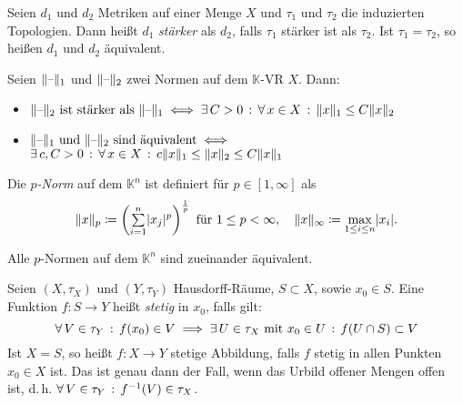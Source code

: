 \documentclass{cheat-sheet}
\newcommand{\K}{\mathbb{K}}
\begin{document}
\begin{definition}
  Seien $d_1$ und $d_2$ Metriken auf einer Menge $X$ und $\tau_1$ und $\tau_2$ die induzierten Topologien. Dann heißt $d_1$ \emph{stärker} als $d_2$, falls $\tau_1$ stärker ist als $\tau_2$. Ist $\tau_1 = \tau_2$, so heißen $d_1$ und $d_2$ äquivalent.
\end{definition}


\begin{satz}
  Seien $\lVert\text{--}\rVert_1$ und $\lVert\text{--}\rVert_2$ zwei Normen auf dem $\K$-VR $X$. Dann:
  \begin{itemize}
    \item $\lVert\text{--}\rVert_2 \text{ ist stärker als } \lVert\text{--}\rVert_1 \iff \exists \, {C > 0} \,:\, \forall \, {x \in X} \,:\, \lVert x\rVert_1 \leq C \lVert x\rVert_2$
    \item $\lVert\text{--}\rVert_1 \text{ und } \lVert\text{--}\rVert_2 \text{ sind äquivalent} \iff $\\
    $\exists \, {c, C > 0} \,:\, \forall \, {x \in X} \,:\, c \lVert x\rVert_1 \leq \lVert x\rVert_2 \leq C \lVert x\rVert_1$
  \end{itemize}
\end{satz}

\begin{definition}
  Die \emph{$p$-Norm} auf dem $\K^n$ ist definiert für $p \in \left[ 1, \infty \right]$ als
  \[
    \norm{x}_p \coloneqq \left( \sum_{i = 1}^n \abs{x_j}^p \right)^{\frac{1}{p}} \text{ für } 1 \leq p < \infty, \quad
    \norm{x}_{\infty} \coloneqq \max_{1 \leq i \leq n} \abs{x_i}.
  \]
\end{definition}

\begin{bem}
  Alle $p$-Normen auf dem $\K^n$ sind zueinander äquivalent.
\end{bem}



\begin{definition}
  Seien $(X, \tau_X)$ und $(Y, \tau_Y)$ Hausdorff-Räume, $S \subset X$, sowie $x_0 \in S$. Eine Funktion $f : S \to Y$ heißt \emph{stetig} in $x_0$, falls gilt:
  \[ \forall \, {V \in \tau_Y} \,:\, f(x_0) \in V \implies \exists \, {U \in \tau_X \text{ mit } x_0 \in U} \,:\, f(U \cap S) \subset V \]
  Ist $X = S$, so heißt $f : X \to Y$ stetige Abbildung, falls $f$ stetig in allen Punkten $x_0 \in X$ ist. Das ist genau dann der Fall, wenn das Urbild offener Mengen offen ist, d.\,h. $\forall \, {V \in \tau_Y} \,:\, f^{-1}(V) \in \tau_X$.
\end{definition}
\end{document}

